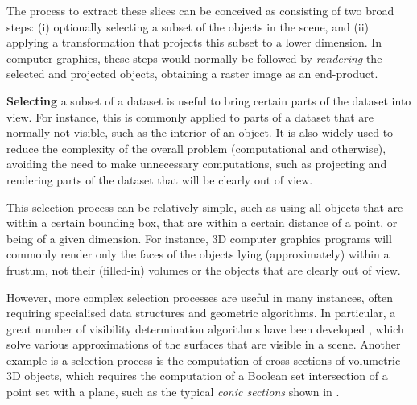 The process to extract these slices can be conceived as consisting of two broad steps: (i) optionally selecting a subset of the objects in the scene, and (ii) applying a transformation that projects this subset to a lower dimension.
In computer graphics, these steps would normally be followed by \emph{rendering} the selected and projected objects, obtaining a raster image as an end-product.

\textbf{Selecting} a subset of a dataset is useful to bring certain parts of the dataset into view.
For instance, this is commonly applied to parts of a dataset that are normally not visible, such as the interior of an object.
It is also widely used to reduce the complexity of the overall problem (computational and otherwise), avoiding the need to make unnecessary computations, such as projecting and rendering parts of the dataset that will be clearly out of view.

This selection process can be relatively simple, such as using all objects that are within a certain bounding box, that are within a certain distance of a point, or being of a given dimension.
For instance, 3D computer graphics programs will commonly render only the faces of the objects lying (approximately) within a frustum, not their (filled-in) volumes or the objects that are clearly out of view.

However, more complex selection processes are useful in many instances, often requiring specialised data structures and geometric algorithms.
In particular, a great number of visibility determination algorithms have been developed \citep[Ch.~36]{Hughes14}, which solve various approximations of the surfaces that are visible in a scene.
Another example is a selection process is the computation of cross-sections of volumetric 3D objects, which requires the computation of a Boolean set intersection of a point set with a plane, such as the typical \emph{conic sections} shown in .

